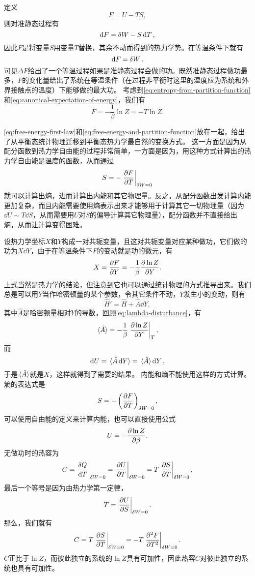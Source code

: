 \documentclass[hyperref, UTF8, a4paper]{ctexart}
\begin{document}
定义
\begin{equation}
    F = U - TS, 
\end{equation}
则对准静态过程有
\begin{equation}
    \dd{F} = \var{W} - S \dd{T},
    \label{eq:free-energy-first-law}
\end{equation}
因此$F$是将变量$S$用变量$T$替换，其余不动而得到的热力学势。在等温条件下就有
\[
    \dd{F} = \var{W}.
\]
可见$\Delta F$给出了一个等温过程如果是准静态过程会做的功。既然准静态过程做功最多，$F$的变化量给出了系统在等温条件（在过程非平衡时这里的温度应为系统和外界接触点的温度）下能够做的最大功。
考虑到\eqref{eq:entropy-from-partition-function}和\eqref{eq:canonical-expectation-of-energy}，我们有
\begin{equation}
    F = - \frac{1}{\beta} \ln Z = - T \ln Z.
    \label{eq:free-energy-and-partition-function}
\end{equation}

\eqref{eq:free-energy-first-law}和\eqref{eq:free-energy-and-partition-function}放在一起，给出了从平衡态统计物理迁移到平衡态热力学最自然的变换方式。
这一方面是因为从配分函数到热力学自由能的过程非常简单，一方面是因为，用这种方式计算出的热力学自由能是温度的函数，从而通过
\[
    S = - \eval{\pdv{F}{T}}_{\var{W} = 0}
\]
就可以计算出熵，进而计算出内能和其它物理量。反之，从配分函数出发计算内能更加复杂，而且内能需要使用熵表示出来才能够用于计算其它一切物理量（因为$\dd{U} \sim T \dd{S}$，从而需要用$U$对$S$的偏导计算其它物理量），配分函数并不直接给出熵，从而让计算变得困难。

设热力学坐标$X$和$Y$构成一对共轭变量，且这对共轭变量对应某种做功，它们做的功为$X \dd{Y}$，由于在等温条件下$F$的变动就是功的微元，有
\begin{equation}
    X = \pdv{F}{Y} = -\frac{1}{\beta} \pdv{\ln Z}{Y}.
\end{equation}
上式当然是热力学的结论，但注意到它也可以通过统计物理的方式推导出来。我们总是可以用$Y$当作哈密顿量的某个参数，令其它条件不动，$Y$发生小的变动，则有
\[
    \hat{H}' = \hat{H} + \hat{A} \dd{Y},
\]
其中$\hat{A}$是哈密顿量相对$Y$的导数，回顾\eqref{eq:lambda-disturbance}，有
\[
    \expval*{\hat{A}} = - \frac{1}{\beta} \eval{\pdv{\ln Z}{Y}}_{T},
\]
而
\[
    \dd{U} = \expval*{\hat{A} \dd{Y}} = \expval*{\hat{A}} \dd{Y},
\]
于是$\expval*{\hat{A}}$就是$X$，这样就得到了需要的结果。
内能和熵不能使用这样的方式计算。熵的表达式是
\begin{equation}
    S = - \left( \pdv{F}{T} \right)_{\var{W}=0},
\end{equation}
可以使用自由能的定义来计算内能，也可以直接使用公式
\begin{equation}
    U = - \pdv{\ln Z}{\beta}.
\end{equation}
无做功时的热容为
\[
    C = \eval{\frac{\var{Q}}{\dd{T}}}_{\var{W}=0} = \eval{\pdv{U}{T}}_{\var{W}=0} = T \eval{\pdv{S}{T}}_{\var{W}=0},
\]
最后一个等号是因为由热力学第一定律，
\[
    T = \eval{\pdv{U}{S}}_{\var{W}=0}.
\]
那么，我们就有
\begin{equation}
    C = T \eval{\pdv{S}{T}}_{\var{W}=0} = - T \eval{\pdv[2]{F}{T}}_{\var{W}=0}.
\end{equation}
$C$正比于$\ln Z$，而彼此独立的系统的$\ln Z$具有可加性，因此热容$C$对彼此独立的系统也具有可加性。
\end{document}

